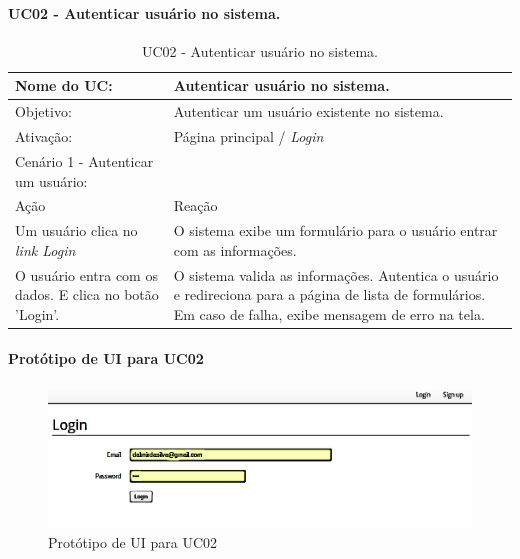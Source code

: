 \documentclass[11pt]{article}
\begin{document}
  \newpage

      \paragraph{UC02 - Autenticar usuário no sistema.} \hspace{10pt}

      \begin{table}[h]
        \begin{center}
          \begin{tabular}{ | p{7cm} | p{8cm} | }
            \hline
            Nome do UC: \cellcolor{gray} & Autenticar usuário no sistema. \\
            \hline
            Objetivo: \cellcolor{gray} & Autenticar um usuário existente no sistema. \\
            \hline
            Ativação: \cellcolor{gray} & Página principal / \em Login \\
            \hline
            \hline
            Cenário 1 - Autenticar um usuário: &  \\
            \hline
            Ação\cellcolor{gray} & Reação\cellcolor{gray} \\
            \hline
            Um usuário clica no \em link Login & O sistema exibe um formulário para o usuário entrar com as informações. \\
            \hline
            O usuário entra com os dados. E clica no botão 'Login'. & O sistema valida as informações. Autentica o usuário e redireciona para a página de lista de formulários. Em caso de falha, exibe mensagem de erro na tela. \\
            \hline
          \end{tabular}
          \caption{UC02 - Autenticar usuário no sistema.}
        \end{center}
      \end{table}

      \paragraph{Protótipo de UI para UC02} \hspace{10pt}
      
      \begin{figure}[h!]
        \centering
        \includegraphics[width=.9\textwidth]{authenticate_user.png}
        \caption{Protótipo de UI para UC02}
      \end{figure}
\end{document}
